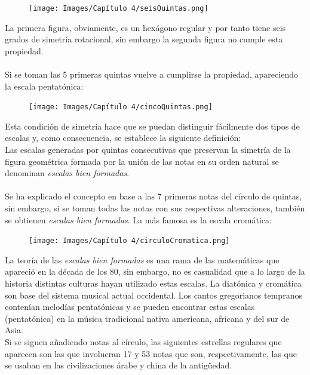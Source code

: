 \documentclass[a4paper, openright, 11pt, titlepage]{report}
\theoremstyle{definition}\newtheorem{defin}[propo]{Definition}
\theoremstyle{definition}\newtheorem{obser}[propo]{Remark}
\theoremstyle{definition}\newtheorem{ejem}[propo]{Ejemplo}
\theoremstyle{definition}\newtheorem{algoritmo}[propo]{Algoritmo}
\begin{document}
\begin{figure}[H]
    \centering
    \texttt{[image: Images/Capítulo 4/seisQuintas.png]}
\end{figure}
La primera figura, obviamente, es un hexágono regular y por tanto tiene seis grados de simetría rotacional, sin embargo la segunda figura no cumple esta propiedad.\\\\
Si se toman las 5 primeras quintas vuelve a cumplirse la propiedad, apareciendo la escala pentatónica:
\begin{figure}[H]
    \centering
    \texttt{[image: Images/Capítulo 4/cincoQuintas.png]}
\end{figure}
Esta condición de simetría hace que se puedan distinguir fácilmente dos tipos de escalas y, como consecuencia, se establece la siguiente definición:\\
Las escalas generadas por quintas consecutivas que preservan la simetría de la figura geométrica formada por la unión de las notas en su orden natural se denominan \textit{escalas bien formadas}.\\\\
Se ha explicado el concepto en base a las 7 primeras notas del círculo de quintas, sin embargo, si se toman todas las notas con sus respectivas alteraciones, también se obtienen \textit{escalas bien formadas}. La más famosa es la escala cromática: 
\begin{figure}[H]
    \centering
    \texttt{[image: Images/Capítulo 4/circuloCromatica.png]}
\end{figure}
La teoría de las \textit{escalas bien formadas} es una rama de las matemáticas que apareció en la década de los 80, sin embargo, no es casualidad que a lo largo de la historia distintas culturas hayan utilizado estas escalas. La diatónica y cromática son base del sistema musical actual occidental. Los cantos gregorianos tempranos contenían melodías pentatónicas y se pueden encontrar estas escalas (pentatónica) en la música tradicional nativa americana, africana y del sur de Asia.\\
Si se siguen añadiendo notas al círculo, las siguientes estrellas regulares que aparecen son las que involucran 17 y 53 notas que son, respectivamente, las que se usaban en las civilizaciones árabe y china de la antigüedad.
\end{document}
